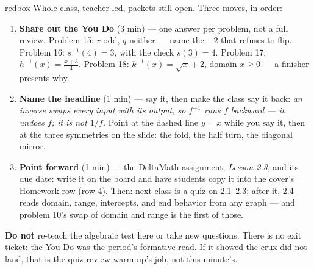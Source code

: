 \documentclass[10pt]{article}
\begin{document}
\boxguard[20]
\begin{skillbox}{redbox}
Whole class, teacher-led, packets still open. Three moves, in order:
\begin{enumerate}[itemsep=3pt]
  \item \textbf{Share out the You Do} (3 min) --- one answer per problem, not a full review.
        Problem 15: $r$ odd, $q$ neither --- name the $-2$ that refuses to flip. Problem 16:
        $s^{-1}(4) = 3$, with the check $s(3) = 4$. Problem 17: $h^{-1}(x) = \frac{x + 3}{4}$.
        Problem 18: $k^{-1}(x) = \sqrt{x} + 2$, domain $x \ge 0$ --- a finisher presents why.
  \item \textbf{Name the headline} (1 min) --- say it, then make the class say it back:
        \textit{an inverse swaps every input with its output, so $f^{-1}$ runs $f$ backward ---
        it undoes $f$; it is not $1/f$.} Point at the dashed line $y = x$ while you say it,
        then at the three symmetries on the slide: the fold, the half turn, the diagonal
        mirror.
  \item \textbf{Point forward} (1 min) --- the DeltaMath assignment, \textit{Lesson 2.3}, and
        its due date: write it on the board and have students copy it into the cover's
        Homework row (row 4). Then: next class is a quiz on 2.1--2.3; after it, 2.4 reads
        domain, range, intercepts, and end behavior from any graph --- and problem 10's
        swap of domain and range is the first of those.
\end{enumerate}
\textbf{Do not} re-teach the algebraic test here or take new questions. There is no exit
ticket: the You Do was the period's formative read. If it showed the crux
did not land, that is the quiz-review warm-up's job, not this minute's.
\end{skillbox}
\end{document}
